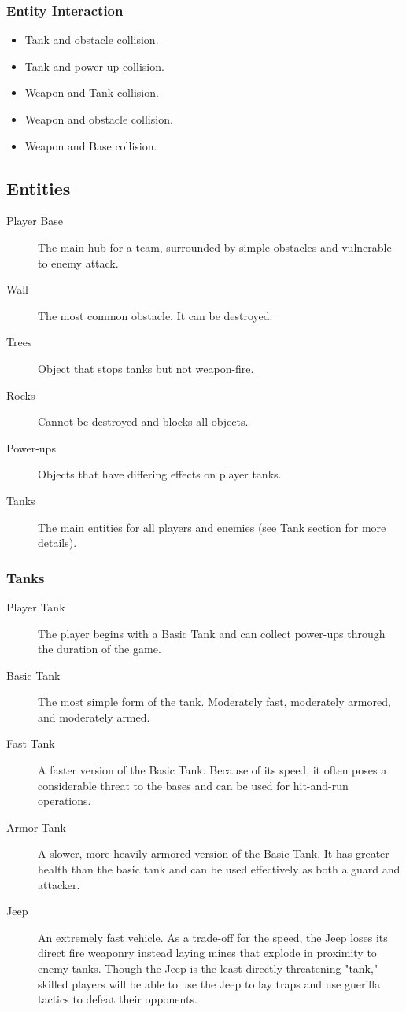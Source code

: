 \documentclass[letterpaper,11pt,twoside]{article}
\begin{document}
\subsubsection{Entity Interaction}
\begin{itemize}
 \item Tank and obstacle collision.
 \item Tank and power-up collision.
 \item Weapon and Tank collision.
 \item Weapon and obstacle collision.
 \item Weapon and Base collision.
\end{itemize}

\subsection{Entities}
\begin{description}
 \item[Player Base] The main hub for a team, surrounded by simple obstacles and vulnerable to enemy attack.
 \item[Wall] The most common obstacle. It can be destroyed.
 \item[Trees] Object that stops tanks but not weapon-fire.
 \item[Rocks] Cannot be destroyed and blocks all objects.
 \item[Power-ups] Objects that have differing effects on player tanks.
 \item[Tanks] The main entities for all players and enemies (see Tank section for more details).
\end{description}

\subsubsection{Tanks}
\begin{description}
 \item[Player Tank] The player begins with a Basic Tank and can collect power-ups through the duration of the game.
 
 \item[Basic Tank] The most simple form of the tank. Moderately fast, moderately armored, and moderately armed.

 \item[Fast Tank] A faster version of the Basic Tank. Because of its speed, it often poses a considerable threat to the bases and can be used for hit-and-run operations.

 \item[Armor Tank] A slower, more heavily-armored version of the Basic Tank. It has greater health than the basic tank and can be used effectively as both a guard and attacker.

 \item[Jeep] An extremely fast vehicle. As a trade-off for the speed, the Jeep loses its direct fire weaponry instead laying mines that explode in proximity to enemy tanks. Though the Jeep is the least directly-threatening "tank," skilled players will be able to use the Jeep to lay traps and use guerilla tactics to defeat their opponents.
\end{description}
\end{document}
